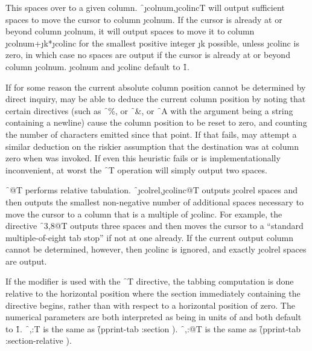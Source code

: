 
This spaces over to a given column.
\f{~\j{colnum},\j{colinc}T} will output
sufficient spaces to move the cursor to column \j{colnum}.  If the cursor
is already at or beyond column \j{colnum}, it will output spaces to move it to
column \j{colnum}+\j{k}*\j{colinc} for the smallest positive integer
\j{k} possible, unless \j{colinc} is zero, in which case no spaces
are output if the cursor is already at or beyond column \j{colnum}.
\j{colnum} and \j{colinc} default to \f{1}.

If for some reason the current absolute column position cannot be determined
by direct inquiry,
may be able to deduce the current column position by noting         
that certain directives (such as \f{~\%}, or \f{~\&},
or \f{~A} 
with the argument being a string containing a newline) cause
the column position to be reset to zero, and counting the number of characters
emitted since that point.  If that fails,  
may attempt a
similar deduction on the riskier assumption that the destination was
at column zero when  
was invoked.  If even this heuristic fails
or is implementationally inconvenient, at worst
the \f{~T} operation will simply output two spaces.

\f{~@T} performs relative tabulation.
\f{~\j{colrel},\j{colinc}@T} outputs \j{colrel} spaces
and then outputs the smallest non-negative
number of additional spaces necessary to move the cursor
to a column that is a multiple                                       
of \j{colinc}.  For example, the directive 
\f{~3,8@T} outputs
three spaces and then moves the cursor to a ``standard multiple-of-eight
tab stop'' if not at one already.
If the current output column cannot be determined, however,
then \j{colinc} is ignored, and exactly \j{colrel} spaces are output.

If the  modifier is used with the \f{~T} directive,
the tabbing computation is done relative to the horizontal position where the
section immediately containing the directive begins, rather than with
respect to a horizontal position of zero.  The numerical parameters are
both interpreted as being in units of  and both default to \f{1}.
\f{~,:T} is the same as 
  \f{(pprint-tab :section  )}.
\f{~,:@T} is the same as
  \f{(pprint-tab :section-relative  )}.

\endsubsubsection%

